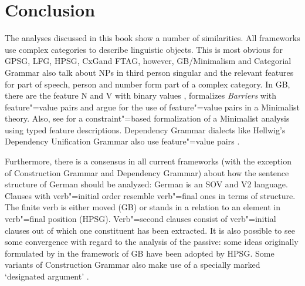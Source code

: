 \chapter{Conclusion}
\label{chap-conclusion}

The analyses discussed in this book show a number of similarities. All frameworks use complex
categories to describe linguistic objects. This is most obvious for GPSG\indexgpsg,
LFG\indexlfg, HPSG\indexhpsg, CxG\indexcxg and FTAG\indextag, however, GB/Minimalism and Categorial Grammar also talk about NPs in third person singular and the relevant features for part of
speech, person and number form part of a complex category. In GB, there are the feature N and V with binary values \citep[]{Chomsky70a}, \citet[]{Stabler92a-u} formalizes \emph{Barriers} with feature"=value pairs and \citet[--291]{SE2002a} argue for the use of feature"=value pairs in a Minimalist theory\indexmp. Also, see \citet[\page]{Veenstra98a} for a constraint"=based formalization
of a Minimalist analysis using typed feature descriptions. Dependency Grammar dialects like
Hellwig's Dependency Unification Grammar also use feature"=value
pairs \citep[]{Hellwig2003a}.

Furthermore, there is a consensus in all current frameworks (with the exception of Construction
Grammar and Dependency Grammar) about how the sentence structure of German should
be analyzed: German is an SOV and V2 language. Clauses with verb"=initial order resemble verb"=final ones in terms of structure. The finite verb is
either moved (GB) or stands in a relation to an element in verb"=final position (HPSG). Verb"=second
clauses consist of  verb"=initial clauses out of which one constituent has been extracted. It is also possible to see some convergence with regard to the analysis of the passive: some ideas originally formulated
by \citet{Haider84b,Haider85b,Haider86} in the framework of GB have been adopted by HPSG. Some
variants of Construction Grammar also make use of a specially marked `designated
argument' \citep[--57]{MR2001a}.

